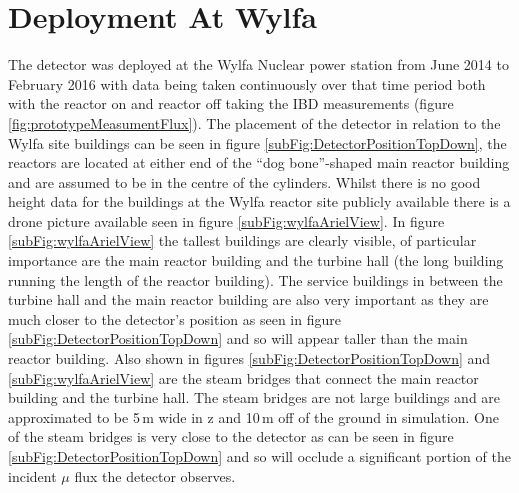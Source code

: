\section{Deployment At Wylfa}\label{sec:deploymentAtWylfa}
The detector was deployed at the Wylfa Nuclear power station from June 2014 to February 2016 with data being taken continuously over that time period both with the reactor on and reactor off taking the IBD measurements \cite{Carroll_2018} (figure \ref{fig:prototypeMeasumentFlux}). The placement of the detector in relation to the Wylfa site buildings can be seen in figure \ref{subFig:DetectorPositionTopDown}, the reactors are located at either end of the ``dog bone''-shaped main reactor building and are assumed to be in the centre of the cylinders. Whilst there is no good height data for the buildings at the Wylfa reactor site publicly available there is a drone picture available seen in figure \ref{subFig:wylfaArielView}. In figure \ref{subFig:wylfaArielView} the tallest buildings are clearly visible, of particular importance are the main reactor building and the turbine hall (the long building running the length of the reactor building). The service buildings in between the turbine hall and the  main reactor building are also very important as they are much closer to the detector's position as seen in figure \ref{subFig:DetectorPositionTopDown} and so will appear taller than the main reactor building. Also shown in figures \ref{subFig:DetectorPositionTopDown} and \ref{subFig:wylfaArielView} are the steam bridges that connect the main reactor building and the turbine hall. The steam bridges are not large buildings and are approximated to be 5\,m wide in z and 10\,m off of the ground in simulation. One of the steam bridges is very close to the detector as can be seen in figure \ref{subFig:DetectorPositionTopDown} and so will occlude a significant portion of the incident $\mu$ flux the detector observes. 

